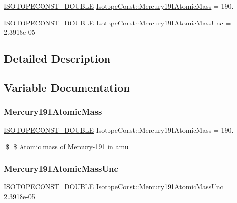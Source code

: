 \begin{DoxyCompactItemize}
\item 
\mbox{\hyperlink{group___isotope_const-_macros_ga8f45a7272ce02c0b4c65c44636ed719a}{I\+S\+O\+T\+O\+P\+E\+C\+O\+N\+S\+T\+\_\+\+D\+O\+U\+B\+LE}} \mbox{\hyperlink{group___isotope_const-_mercury-_hg191_ga7f6130d6ae0248abf50956bc109e2b53}{Isotope\+Const\+::\+Mercury191\+Atomic\+Mass}} = 190.
\item 
\mbox{\hyperlink{group___isotope_const-_macros_ga8f45a7272ce02c0b4c65c44636ed719a}{I\+S\+O\+T\+O\+P\+E\+C\+O\+N\+S\+T\+\_\+\+D\+O\+U\+B\+LE}} \mbox{\hyperlink{group___isotope_const-_mercury-_hg191_ga8e3259a9ed9c33e989b15abc6b8ad0a3}{Isotope\+Const\+::\+Mercury191\+Atomic\+Mass\+Unc}} = 2.\+3918e-\/05
\end{DoxyCompactItemize}


\subsection{Detailed Description}


\subsection{Variable Documentation}
\mbox{\label{group___isotope_const-_mercury-_hg191_ga7f6130d6ae0248abf50956bc109e2b53}} 
\subsubsection{\texorpdfstring{Mercury191\+Atomic\+Mass}{Mercury191AtomicMass}}
{\footnotesize\ttfamily \mbox{\hyperlink{group___isotope_const-_macros_ga8f45a7272ce02c0b4c65c44636ed719a}{I\+S\+O\+T\+O\+P\+E\+C\+O\+N\+S\+T\+\_\+\+D\+O\+U\+B\+LE}} Isotope\+Const\+::\+Mercury191\+Atomic\+Mass = 190.}

\$ \$ Atomic mass of Mercury-\/191 in amu. \mbox{\label{group___isotope_const-_mercury-_hg191_ga8e3259a9ed9c33e989b15abc6b8ad0a3}} 
\subsubsection{\texorpdfstring{Mercury191\+Atomic\+Mass\+Unc}{Mercury191AtomicMassUnc}}
{\footnotesize\ttfamily \mbox{\hyperlink{group___isotope_const-_macros_ga8f45a7272ce02c0b4c65c44636ed719a}{I\+S\+O\+T\+O\+P\+E\+C\+O\+N\+S\+T\+\_\+\+D\+O\+U\+B\+LE}} Isotope\+Const\+::\+Mercury191\+Atomic\+Mass\+Unc = 2.\+3918e-\/05}

